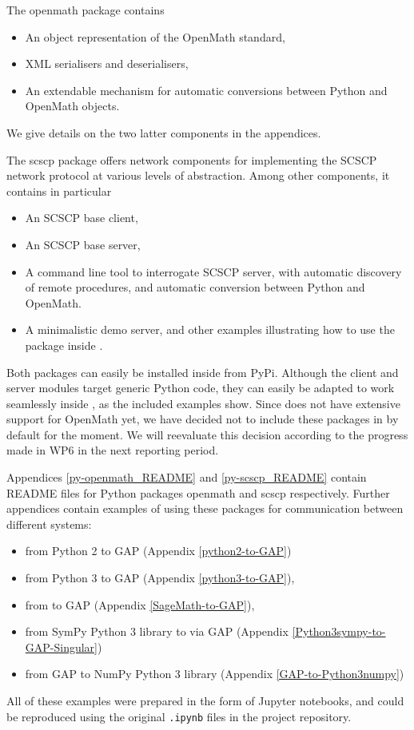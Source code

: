 \documentclass{deliverablereport}
\begin{document}
The {\sf openmath} package contains
\begin{itemize}
\item An object representation of the OpenMath standard,
\item XML serialisers and deserialisers,
\item An extendable mechanism for automatic conversions between Python
  and OpenMath objects.
\end{itemize}
We give details on the two latter components in the appendices.

The {\sf scscp} package offers network components for implementing the
SCSCP network protocol at various levels of abstraction. Among other
components, it contains in particular
\begin{itemize}
\item An SCSCP base client,
\item An SCSCP base server,
\item A command line tool to interrogate SCSCP server, with automatic
  discovery of remote procedures, and automatic conversion between
  Python and OpenMath.
\item A minimalistic demo server, and other examples illustrating how to
  use the package inside \Sage.
\end{itemize}

Both packages can easily be installed inside \Sage from PyPi. Although
the client and server modules target generic Python code, they can
easily be adapted to work seamlessly inside \Sage, as the included
examples show. Since \Sage does not have extensive support for
OpenMath yet, we have decided not to include these packages in \Sage
by default for the moment. We will reevaluate this decision according
to the progress made in WP6 in the next reporting period.

Appendices \ref{py-openmath_README} and \ref{py-scscp_README}
contain README files for Python packages {\sf openmath} and {\sf scscp}
respectively. Further appendices contain examples of using these packages
for communication between different systems:
\begin{itemize}
\item from Python 2 to GAP (Appendix \ref{python2-to-GAP})
\item from Python 3 to GAP (Appendix \ref{python3-to-GAP}),
\item from \Sage to GAP (Appendix \ref{SageMath-to-GAP}),
\item from SymPy Python 3 library to \Singular via GAP (Appendix \ref{Python3sympy-to-GAP-Singular})
\item from GAP to NumPy Python 3 library (Appendix \ref{GAP-to-Python3numpy})
\end{itemize}
All of these examples were prepared in the form of Jupyter notebooks,
and could be reproduced using the original {\tt .ipynb} files in the
project repository.
\end{document}

